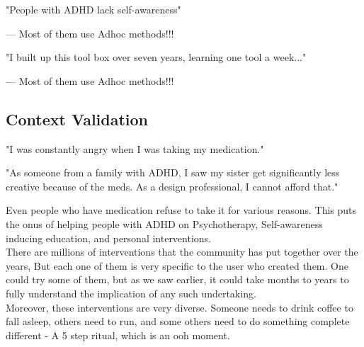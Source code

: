 \documentclass[
	fontsize=15pt,
	twoside=false,
	secnumdepth=2
]{kaobook}
\begin{document}
\begin{displayquote} 
"People with ADHD lack self-awareness" 
\end{displayquote}
\hfill --- Most of them use Adhoc methods!!! \\

\begin{displayquote} 
"I built up this tool box over seven years, learning one tool a week..." 
\end{displayquote}
\hfill --- Most of them use Adhoc methods!!! \\

\newpage

\subsection{Context Validation}

\begin{displayquote} 
\textcolor{RedOrange}{"I was constantly angry when I was taking my medication."} 
\end{displayquote}

\begin{displayquote} 
\textcolor{RoyalPurple}{"As someone from a family with ADHD, I saw my sister get significantly less creative because of the meds. As a design professional, I cannot afford that."} 
\end{displayquote}

Even people who have medication refuse to take it for various reasons. This puts the onus of helping people with ADHD on Psychotherapy, Self-awareness inducing education, and personal interventions. \\


There are millions of interventions that the community has put together over the years, But each one of them is very specific to the user who created them. One could try some of them, but as we saw earlier, it could take months to years to fully understand the implication of any such undertaking. \\

Moreover, these interventions are very diverse. Someone needs to drink coffee to fall asleep, others need to run, and some others need to do something complete different - A 5 step ritual, which is an ooh moment.  \\
\end{document}
